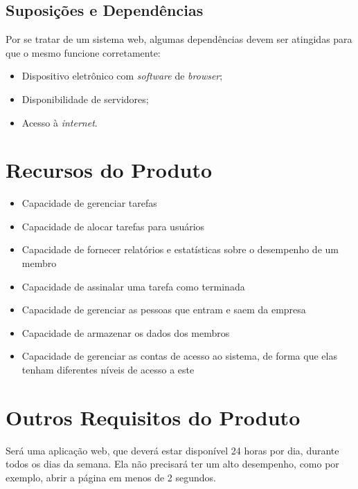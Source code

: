 \begin{apendicesenv}
\subsection{Suposições e Dependências}

Por se tratar de um sistema web, algumas dependências devem ser atingidas para que o mesmo funcione corretamente:

\begin{itemize}
\item Dispositivo eletrônico com \textit{software} de \textit{browser};
\item Disponibilidade de servidores;
\item Acesso à \textit{internet}.
\end{itemize}

\section{Recursos do Produto}

\begin{itemize}
\item Capacidade de gerenciar tarefas
\item Capacidade de alocar tarefas para usuários
\item Capacidade de fornecer relatórios e estatísticas sobre o desempenho de um membro
\item Capacidade de assinalar uma tarefa como terminada
\item Capacidade de gerenciar as pessoas que entram e saem da empresa
\item Capacidade de armazenar os dados dos membros
\item Capacidade de gerenciar as contas de acesso ao sistema, de forma que elas tenham diferentes níveis de acesso a este
\end{itemize}

\section{Outros Requisitos do Produto}

Será uma aplicação web, que deverá estar disponível 24 horas por dia, durante todos os dias da semana.
Ela não precisará ter um alto desempenho, como por exemplo, abrir a página em menos de 2 segundos.

\end{apendicesenv}
